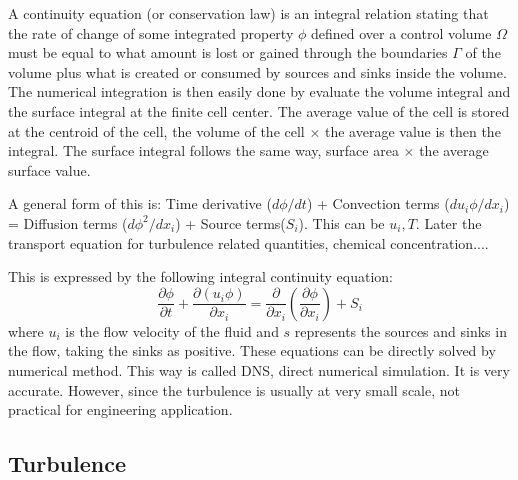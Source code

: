 \documentclass{article}
\begin{document}
A continuity equation (or conservation law) is an integral relation stating that the rate of change of some integrated property $\phi$  defined over a control volume $\Omega$  must be equal to what amount is lost or gained through the boundaries $\Gamma$ of the volume plus what is created or consumed by sources and sinks inside the volume. 
The numerical integration is then easily done by evaluate the volume integral and the surface integral at the finite cell center. The average value of the cell is stored at the centroid of the cell, the volume of the cell $\times$ the average value is then the integral. The surface integral follows the same way, surface area $\times$ the average surface value. 

A general form of this is: Time derivative ($d\phi/dt$) + Convection terms ($du_i\phi/dx_i$) = Diffusion terms ($d\phi^2 / dx_i$) + Source terms($S_i$). This can be $u_i, T$. Later the transport equation for turbulence related quantities, chemical concentration.... 


This is expressed by the following integral continuity equation:
\begin{equation}
\frac{\partial \phi}{\partial t} + \frac{\partial (u_i\phi)}{\partial x_i} = \frac{\partial}{\partial x_i}(\frac{\partial \phi}{\partial x_i}) + S_i
\end{equation}
where $u_i$ is the flow velocity of the fluid and $ s $ represents the sources and sinks in the flow, taking the sinks as positive. These equations can be directly solved by numerical method. This way is called DNS, direct numerical simulation. It is very accurate. However, since the turbulence is usually at very small scale, not practical for engineering application. 
\subsection{Turbulence}
\end{document}
